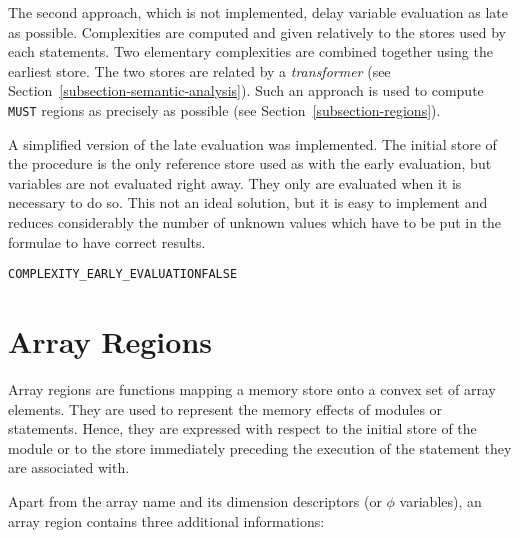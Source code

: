 \documentclass[a4paper]{report}
\newenvironment{PipsProp}{\begin{alltt}}{\end{alltt}}
\begin{document}
The second approach, which is not implemented, delay variable evaluation
as late as possible. Complexities are computed and given relatively to
the stores used by each statements. Two elementary complexities are combined
together using the earliest store. The two stores are related by a {\em
transformer} (see Section~\ref{subsection-semantic-analysis}). Such an
approach is used to compute {\tt MUST} regions as precisely as possible
(see Section~\ref{subsection-regions}).

A simplified version of the late evaluation was implemented. The initial
store of the procedure is the only reference store used as with the
early evaluation, but variables are not evaluated right away. They only
are evaluated when it is necessary to do so. This not an ideal solution,
but it is easy to implement and reduces considerably the number of
unknown values which have to be put in the formulae to have correct
results.

\begin{PipsProp}
COMPLEXITY_EARLY_EVALUATION FALSE
\end{PipsProp}



\section{Array Regions}
\label{subsection-array-regions}



Array regions are functions mapping a memory store onto a convex set
of array elements. They are used to represent the memory effects of
modules or statements. Hence, they are expressed with respect to the
initial store of the module or to the store immediately preceding the
execution of the statement they are associated with. 

Apart from the array name and its dimension descriptors (or
$\phi$ variables), an array region contains three additional informations:
 
\end{document}
